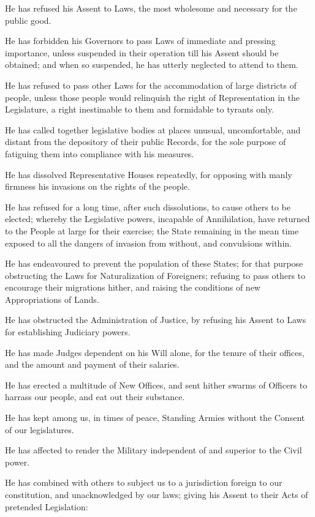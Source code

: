 He has refused his Assent to Laws, the most wholesome and necessary
for the public good.

He has forbidden his Governors to pass Laws of immediate and pressing
importance, unless suspended in their operation till his Assent should
be obtained; and when so suspended, he has utterly neglected to
attend to them.

He has refused to pass other Laws for the accommodation of large
districts of people, unless those people would relinquish the right of
Representation in the Legislature, a right inestimable to them and
formidable to tyrants only.

He has called together legislative bodies at places unusual,
uncomfortable, and distant from the depository of their public
Records, for the sole purpose of fatiguing them into compliance with
his measures.

He has dissolved Representative Houses repeatedly, for opposing with
manly firmness his invasions on the rights of the people.

He has refused for a long time, after such dissolutions, to cause
others to be elected; whereby the Legislative powers, incapable of
Annihilation, have returned to the People at large for their exercise;
the State remaining in the mean time exposed to all the dangers of
invasion from without, and convulsions within.

He has endeavoured to prevent the population of these States; for that
purpose obstructing the Laws for Naturalization of Foreigners;
refusing to pass others to encourage their migrations hither, and
raising the conditions of new Appropriations of Lands.

He has obstructed the Administration of Justice, by refusing his
Assent to Laws for establishing Judiciary powers.

He has made Judges dependent on his Will alone, for the tenure of
their offices, and the amount and payment of their salaries.

He has erected a multitude of New Offices, and sent hither swarms of
Officers to harrass our people, and eat out their substance.

He has kept among us, in times of peace, Standing Armies without the
Consent of our legislatures.

He has affected to render the Military independent of and superior to
the Civil power.

He has combined with others to subject us to a jurisdiction foreign to
our constitution, and unacknowledged by our laws; giving his Assent to
their Acts of pretended Legislation:

